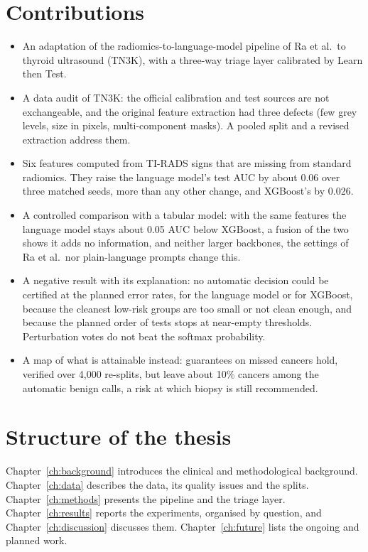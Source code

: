 \section{Contributions}

\begin{itemize}
  \item An adaptation of the radiomics-to-language-model pipeline of Ra et al.\ to thyroid
        ultrasound (TN3K), with a three-way triage layer calibrated by Learn then Test.
  \item A data audit of TN3K: the official calibration and test sources are not exchangeable, and
        the original feature extraction had three defects (few grey levels, size in pixels,
        multi-component masks). A pooled split and a revised extraction address them.
  \item Six features computed from TI-RADS signs that are missing from standard radiomics. They
        raise the language model's test AUC by about 0.06 over three matched seeds, more than any
        other change, and XGBoost's by 0.026.
  \item A controlled comparison with a tabular model: with the same features the language model
        stays about 0.05 AUC below XGBoost, a fusion of the two shows it adds no information, and
        neither larger backbones, the settings of Ra et al.\ nor plain-language prompts change
        this.
  \item A negative result with its explanation: no automatic decision could be certified at the
        planned error rates, for the language model or for XGBoost, because the cleanest low-risk
        groups are too small or not clean enough, and because the planned order of tests stops at
        near-empty thresholds. Perturbation votes do not beat the softmax probability.
  \item A map of what is attainable instead: guarantees on missed cancers hold, verified over
        4,000 re-splits, but leave about 10\% cancers among the automatic benign calls, a risk at
        which biopsy is still recommended.
\end{itemize}

\section{Structure of the thesis}

Chapter~\ref{ch:background} introduces the clinical and methodological background.
Chapter~\ref{ch:data} describes the data, its quality issues and the splits.
Chapter~\ref{ch:methods} presents the pipeline and the triage layer.
Chapter~\ref{ch:results} reports the experiments, organised by question, and
Chapter~\ref{ch:discussion} discusses them. Chapter~\ref{ch:future} lists the ongoing and planned
work.

